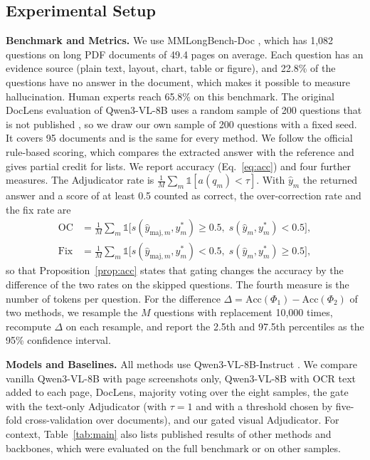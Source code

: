 \documentclass[pdflatex,sn-basic]{sn-jnl}%
\theoremstyle{thmstyletwo}%
\begin{document}
\subsection{Experimental Setup}
\label{sec:setup}
\textbf{Benchmark and Metrics.} We use MMLongBench-Doc \cite{ma2024mmlongbench}, which has 1,082 questions on long PDF documents of 49.4 pages on average. Each question has an evidence source (plain text, layout, chart, table or figure), and 22.8\% of the questions have no answer in the document, which makes it possible to measure hallucination. Human experts reach 65.8\% on this benchmark. The original DocLens evaluation of Qwen3-VL-8B uses a random sample of 200 questions that is not published \cite{zhu2025doclens}, so we draw our own sample of 200 questions with a fixed seed. It covers 95 documents and is the same for every method. We follow the official rule-based scoring, which compares the extracted answer with the reference and gives partial credit for lists. We report accuracy (Eq.~\eqref{eq:acc}) and four further measures. The Adjudicator rate is $\frac{1}{M}\sum_m\mathbb{1}[a(q_m)<\tau]$. With $\hat y_m$ the returned answer and a score of at least 0.5 counted as correct, the over-correction rate and the fix rate are
\begin{equation}
\begin{aligned}
\mathrm{OC}&=\tfrac{1}{M}\textstyle\sum_m\mathbb{1}\bigl[s(\hat y_{\mathrm{maj},m},y^\ast_m)\ge0.5,\; s(\hat y_m,y^\ast_m)<0.5\bigr],\\
\mathrm{Fix}&=\tfrac{1}{M}\textstyle\sum_m\mathbb{1}\bigl[s(\hat y_{\mathrm{maj},m},y^\ast_m)<0.5,\; s(\hat y_m,y^\ast_m)\ge0.5\bigr],
\end{aligned}
\label{eq:ocfix}
\end{equation}
so that Proposition~\ref{prop:acc} states that gating changes the accuracy by the difference of the two rates on the skipped questions. The fourth measure is the number of tokens per question. For the difference $\Delta=\mathrm{Acc}(\Phi_1)-\mathrm{Acc}(\Phi_2)$ of two methods, we resample the $M$ questions with replacement 10,000 times, recompute $\Delta$ on each resample, and report the 2.5th and 97.5th percentiles as the 95\% confidence interval.

\textbf{Models and Baselines.} All methods use Qwen3-VL-8B-Instruct \cite{bai2025qwen3vl}. We compare vanilla Qwen3-VL-8B with page screenshots only, Qwen3-VL-8B with OCR text added to each page, DocLens, majority voting over the eight samples, the gate with the text-only Adjudicator (with $\tau=1$ and with a threshold chosen by five-fold cross-validation over documents), and our gated visual Adjudicator. For context, Table~\ref{tab:main} also lists published results of other methods and backbones, which were evaluated on the full benchmark or on other samples.
\end{document}
